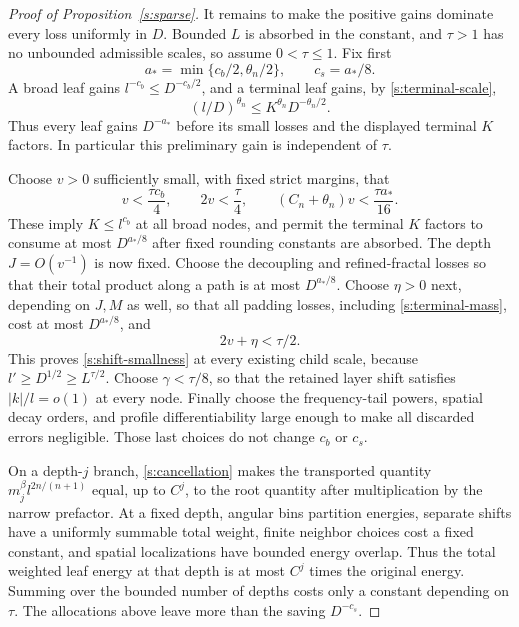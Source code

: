 \begin{proof}[Proof of Proposition~\ref{s:sparse}]
It remains to make the positive gains dominate every loss uniformly
in $D$.  Bounded $L$ is absorbed in the constant, and $\tau>1$ has no
unbounded admissible scales, so assume $0<\tau\le1$.
Fix first
\begin{equation}\label{s:saving-choice}
 a_* =\min\{c_b/2,\theta_n/2\},\qquad c_s=a_*/8.
\end{equation}
A broad leaf gains $l^{-c_b}\le D^{-c_b/2}$, and a terminal leaf
gains, by \eqref{s:terminal-scale},
\[
 (l/D)^{\theta_n}\le K^{\theta_n}D^{-\theta_n/2}.
\]
Thus every leaf gains $D^{-a_*}$ before its small losses and the
displayed terminal $K$ factors.  In particular this preliminary gain
is independent of $\tau$.

Choose $v>0$ sufficiently small, with fixed strict margins, that
\begin{equation}\label{s:parameter-inequalities}
 v<\frac{\tau c_b}{4},\qquad
 2v<\frac\tau4,\qquad
 (C_n+\theta_n)v<\frac{\tau a_*}{16}.
\end{equation}
These imply $K\le l^{c_b}$ at all broad nodes, and permit the terminal
$K$ factors to consume at most $D^{a_*/8}$ after fixed rounding
constants are absorbed.  The depth $J=O(v^{-1})$ is now fixed.
Choose the decoupling and refined-fractal losses so that their total
product along a path is at most $D^{a_*/8}$.  Choose $\eta>0$ next,
depending on $J,M$ as well, so that all padding losses, including
\eqref{s:terminal-mass}, cost at most $D^{a_*/8}$, and
\[
 2v+\eta<\tau/2.
\]
This proves \eqref{s:shift-smallness} at every existing child scale,
because $l'\ge D^{1/2}\ge L^{\tau/2}$.  Choose
$\gamma<\tau/8$, so that the retained layer shift satisfies
$|k|/l=o(1)$ at every node.  Finally choose the frequency-tail powers,
spatial decay orders, and profile differentiability large enough to
make all discarded errors negligible.  Those last choices do not
change $c_b$ or $c_s$.

On a depth-$j$ branch, \eqref{s:cancellation} makes the transported
quantity $m_j^\beta l^{2n/(n+1)}$ equal, up to $C^j$, to the root
quantity after multiplication by the narrow prefactor.  At a fixed
depth, angular bins partition energies, separate shifts have a
uniformly summable total weight, finite neighbor choices cost a fixed
constant, and spatial localizations have bounded energy overlap.
Thus the total weighted leaf energy at that depth is at most $C^j$
times the original energy.  Summing over the bounded number of depths
costs only a constant depending on $\tau$.
The allocations above leave more than the saving $D^{-c_s}$.


\end{proof}
